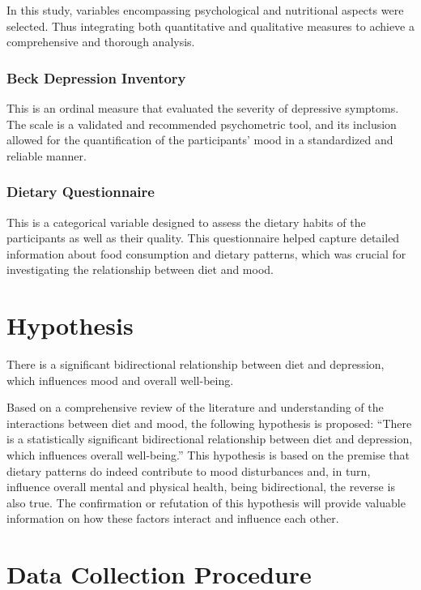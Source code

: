 \documentclass[jou]{apa7}
\begin{document}
In this study, variables encompassing psychological and nutritional aspects were selected. Thus integrating both quantitative and qualitative measures to achieve a comprehensive and thorough analysis.\\

\subsubsection{Beck Depression Inventory}
This is an ordinal measure that evaluated the severity of depressive symptoms. The scale is a validated and recommended psychometric tool, and its inclusion allowed for the quantification of the participants' mood in a standardized and reliable manner.

\subsubsection{Dietary Questionnaire}
This is a categorical variable designed to assess the dietary habits of the participants as well as their quality. This questionnaire helped capture detailed information about food consumption and dietary patterns, which was crucial for investigating the relationship between diet and mood.

\section{Hypothesis}\label{hipuxf3tesis}

There is a significant bidirectional relationship between diet and depression, which influences mood and overall well-being.

Based on a comprehensive review of the literature and understanding of the interactions between diet and mood, the following hypothesis is proposed: ``There is a statistically significant bidirectional relationship between diet and depression, which influences overall well-being.'' This hypothesis is based on the premise that dietary patterns do indeed contribute to mood disturbances and, in turn, influence overall mental and physical health, being bidirectional, the reverse is also true. The confirmation or refutation of this hypothesis will provide valuable information on how these factors interact and influence each other.

\section{Data Collection Procedure}\label{procedimiento-para-recolecciuxf3n-de-datos}
\end{document}
